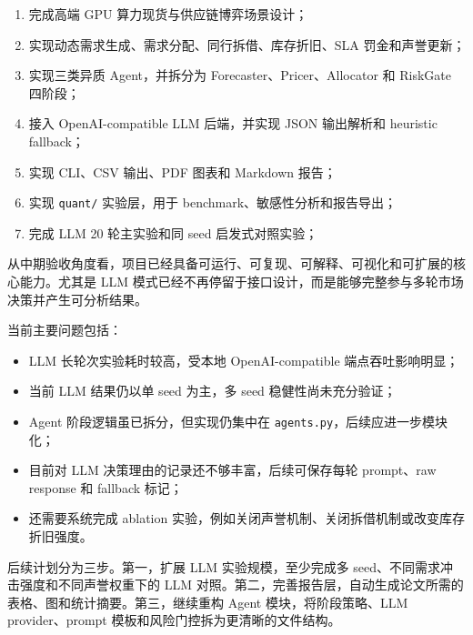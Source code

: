 \documentclass[11pt, a4paper]{article}
\makeatletter
\renewcommand\section{\@startsection{section}{1}{\z@}{-1.2em \@plus -0.3em}{0.5em}{\normalfont\Large\bfseries}}
\makeatother
\begin{document}
\begin{enumerate}
    \item 完成高端 GPU 算力现货与供应链博弈场景设计；
    \item 实现动态需求生成、需求分配、同行拆借、库存折旧、SLA 罚金和声誉更新；
    \item 实现三类异质 Agent，并拆分为 Forecaster、Pricer、Allocator 和 RiskGate 四阶段；
    \item 接入 OpenAI-compatible LLM 后端，并实现 JSON 输出解析和 heuristic fallback；
    \item 实现 CLI、CSV 输出、PDF 图表和 Markdown 报告；
    \item 实现 \texttt{quant/} 实验层，用于 benchmark、敏感性分析和报告导出；
    \item 完成 LLM 20 轮主实验和同 seed 启发式对照实验；
\end{enumerate}

从中期验收角度看，项目已经具备可运行、可复现、可解释、可视化和可扩展的核心能力。尤其是 LLM 模式已经不再停留于接口设计，而是能够完整参与多轮市场决策并产生可分析结果。

\section{问题与后续计划}

当前主要问题包括：

\begin{itemize}
    \item LLM 长轮次实验耗时较高，受本地 OpenAI-compatible 端点吞吐影响明显；
    \item 当前 LLM 结果仍以单 seed 为主，多 seed 稳健性尚未充分验证；
    \item Agent 阶段逻辑虽已拆分，但实现仍集中在 \texttt{agents.py}，后续应进一步模块化；
    \item 目前对 LLM 决策理由的记录还不够丰富，后续可保存每轮 prompt、raw response 和 fallback 标记；
    \item 还需要系统完成 ablation 实验，例如关闭声誉机制、关闭拆借机制或改变库存折旧强度。
\end{itemize}

后续计划分为三步。第一，扩展 LLM 实验规模，至少完成多 seed、不同需求冲击强度和不同声誉权重下的 LLM 对照。第二，完善报告层，自动生成论文所需的表格、图和统计摘要。第三，继续重构 Agent 模块，将阶段策略、LLM provider、prompt 模板和风险门控拆为更清晰的文件结构。

\end{document}
